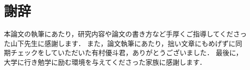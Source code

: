 \chapter*{謝辞}
本論文の執筆にあたり，研究内容や論文の書き方など手厚くご指導してくださった山下先生に感謝します．
また，論文執筆にあたり，拙い文章にもめげずに同期チェックをしていただいた有村優斗君，ありがとうございました．
最後に，大学に行き勉学に励む環境を与えてくださった家族に感謝します．
